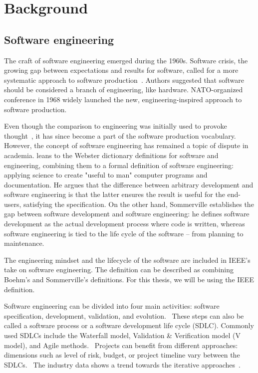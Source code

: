 \chapter{Background}

\section{Software engineering}

The craft of software engineering emerged during the 1960s. Software crisis, the growing gap between expectations and results for software, called for a more systematic approach to software production~\cite{naur_peter_software_1969}. Authors suggested that software should be considered a branch of engineering, like hardware. NATO-organized conference in 1968 widely launched the new, engineering-inspired approach to software production.

Even though the comparison to engineering was initially used to provoke thought~\cite{naur_peter_software_1969}, it has since become a part of the software production vocabulary. However, the concept of software engineering has remained a topic of dispute in academia. \citet{boehm_software_1979} leans to the Webster dictionary definitions for software and engineering, combining them to a formal definition of software engineering: applying science to create "useful to man" computer programs and documentation. He argues that the difference between arbitrary development and software engineering is that the latter ensures the result is useful for the end-users, satisfying the specification. On the other hand, Sommerville establishes the gap between software development and software engineering: he defines software development as the actual development process where code is written, whereas software engineering is tied to the life cycle of the software – from planning to maintenance.~\cite{sommerville_software_2016}

The engineering mindset and the lifecycle of the software are included in IEEE's take on software engineering. The definition can be described as combining Boehm's and Sommerville's definitions. For this thesis, we will be using the IEEE definition.~\cite{ieee_ieee_1990}

Software engineering can be divided into four main activities: software specification, development, validation, and evolution.~\cite{sommerville_software_2016} These steps can also be called a software process or a software development life cycle (SDLC). Commonly used SDLCs include the Waterfall model, Validation \& Verification model (V model), and Agile methods.~\cite{balaji_waterfall_2012} Projects can benefit from different approaches: dimensions such as level of risk, budget, or project timeline vary between the SDLCs.~\cite{alshamrani_comparison_2015, cohen_introduction_2004} The industry data shows a trend towards the iterative approaches~\cite{sommerville_software_2016}. 

